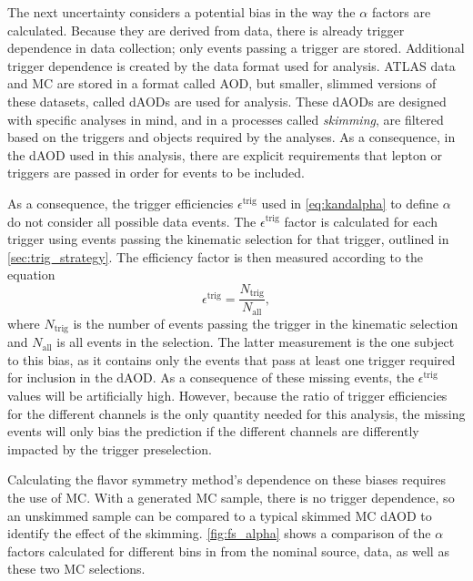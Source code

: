 The next uncertainty considers a potential bias in the way the $\alpha$ factors are calculated. Because they are derived from data, there is already trigger dependence in data collection; only events passing a trigger are stored. Additional trigger dependence is created by the data format used for analysis. \ac{ATLAS} data and \ac{MC} are stored in a format called \ac{AOD}, but smaller, slimmed versions of these datasets, called \acp{dAOD} are used for analysis. These \acp{dAOD} are designed with specific analyses in mind, and in a processes called \textit{skimming}, are filtered based on the triggers and objects required by the analyses. As a consequence, in the \ac{dAOD} used in this analysis, there are explicit requirements that lepton or \met triggers are passed in order for events to be included. 

As a consequence, the trigger efficiencies $\epsilon^\text{trig}$ used in \autoref{eq:kandalpha} to define $\alpha$ do not consider all possible data events. The $\epsilon^\text{trig}$ factor is calculated for each trigger using events passing the kinematic selection for that trigger, outlined in \autoref{sec:trig_strategy}. The efficiency factor is then measured according to the equation
%
\begin{equation}
\epsilon^\text{trig} = \frac{N_\text{trig}}{N_\text{all}} , 
\end{equation}
%
where $N_\text{trig}$ is the number of events passing the trigger in the kinematic selection and $N_\text{all}$ is all events in the selection. The latter measurement is the one subject to this bias, as it contains only the events that pass at least one trigger required for inclusion in the \ac{dAOD}. As a consequence of these missing events, the $\epsilon^\text{trig}$ values will be artificially high. However, because the ratio of trigger efficiencies for the different channels is the only quantity needed for this analysis, the missing events will only bias the prediction if the different channels are differently impacted by the trigger preselection.

Calculating the flavor symmetry method's dependence on these biases requires the use of \ac{MC}. With a generated \ac{MC} sample, there is no trigger dependence, so an unskimmed sample can be compared to a typical skimmed \ac{MC} \ac{dAOD} to identify the effect of the skimming. \autoref{fig:fs_alpha} shows a comparison of the $\alpha$ factors calculated for different bins in \met from the nominal source, data, as well as these two \ac{MC} selections. 

